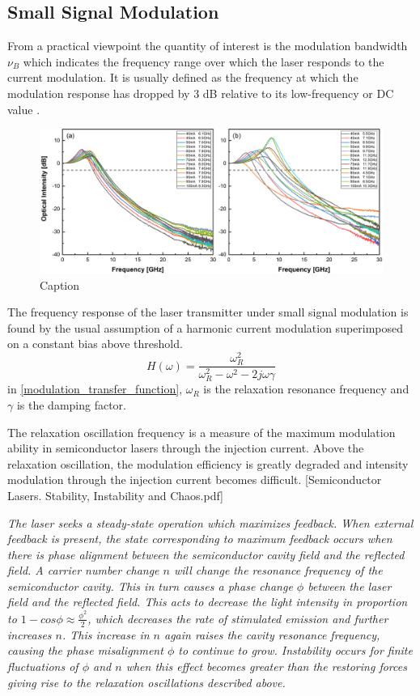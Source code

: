 \subsection{Small Signal Modulation}
From a practical viewpoint the quantity of interest is the modulation bandwidth $\nu_B$ which indicates the frequency range over which the laser responds to the current modulation. It is usually defined as the frequency at which the modulation response has dropped by 3 dB relative to its low-frequency or DC value \cite{agrawal2013semiconductor}.
\begin{figure}[ht]
    \centering
    \includegraphics[width=\linewidth]{figures/bandwidth_gain_scan_cleaved_and_lensed_grating_4679.png}
    \caption{Caption}
    \label{fig:bandwidth_gain_scan_cleaved_and_lensed}
\end{figure}

The frequency response of the laser transmitter under small signal modulation is found by the usual assumption of a harmonic current modulation superimposed on a constant bias above threshold.
\begin{equation}
    H(\omega)=\frac{\omega_R^2}{\omega_R^2-\omega^2-2j\omega\gamma}
    \label{modulation_transfer_function}
\end{equation}
in \autoref{modulation_transfer_function}, $\omega_R$ is the relaxation resonance frequency and $\gamma$ is the damping factor.

The relaxation oscillation frequency is a measure of the maximum modulation ability in semiconductor lasers through the injection current. Above the relaxation oscillation, the modulation efficiency is greatly degraded and intensity modulation through the injection current becomes difficult. [Semiconductor Lasers. Stability, Instability and Chaos.pdf]

\textit{The laser seeks a steady-state operation which maximizes feedback. When external feedback is present, the state corresponding to maximum feedback occurs when there is phase alignment  between the semiconductor cavity field and the reflected field. A carrier number change $n$ will change the resonance frequency of the semiconductor cavity. This in turn causes a phase change $\phi$ between the laser field and the reflected field. This acts to decrease the light intensity in proportion to $1-cos{\phi}\approx\frac{\phi^2}{2}$, which decreases the rate of stimulated emission and further increases $n$. This increase in $n$ again raises the cavity resonance frequency, causing the phase misalignment $\phi$ to continue to grow. Instability occurs for finite fluctuations of $\phi$ and $n$ when this effect becomes greater than the restoring forces giving rise to the relaxation oscillations described above.}


